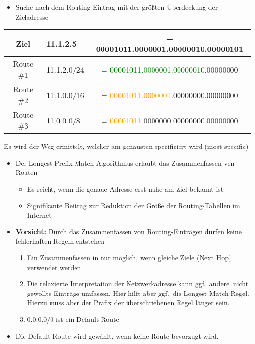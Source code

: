 \begin{itemize}
    \item Suche nach dem Routing-Eintrag mit der größten Überdeckung der Zieladresse
\end{itemize}
\begin{center}
    \begin{tabular}{c l c}
        Ziel & 11.1.2.5 & = 00001011.0000001.00000010.00000101 \tabularnewline
        \hline
        Route \#1 & 11.1.2.0/24 & = \textcolor{green}{00001011.0000001.00000010}.00000000 \tabularnewline
        Route \#2 & 11.1.0.0/16 & = \textcolor{orange}{00001011.0000001}.00000000.00000000 \tabularnewline
        Route \#3 & 11.0.0.0/8 & = \textcolor{orange}{00001011}.0000000.00000000.00000000 \tabularnewline
    \end{tabular}
\end{center}
Es wird der Weg ermittelt, welcher am genausten spezifiziert wird (most specific)

\begin{itemize}
    \item Der Longest Prefix Match Algorithmus erlaubt das Zusammenfassen von Routen
    \begin{itemize}
        \item Es reicht, wenn die genaue Adresse erst nahe am Ziel bekannt ist
        \item Signifikante Beitrag zur Reduktion der Größe der Routing-Tabellen im Internet
    \end{itemize}
    \item \textbf{Vorsicht:} Durch das Zusammenfassen von Routing-Einträgen dürfen keine fehlerhaften Regeln entstehen
    \begin{enumerate}
        \item Ein Zusammenfassen in nur möglich, wenn gleiche Ziele (Next Hop) verwendet werden
        \item Die relaxierte Interpretation der Netzwerkadresse kann ggf.\ andere, nicht gewollte Einträge umfassen.
        Hier hilft aber ggf.\ die Longest Match Regel.
        Hierzu muss aber der Präfix der überschriebenen Regel länger sein.
        \item 0.0.0.0/0 ist ein Default-Route
    \end{enumerate}
\end{itemize}

\begin{itemize}
    \item Die Default-Route wird gewählt, wenn keine Route bevorzugt wird.
\end{itemize}
    